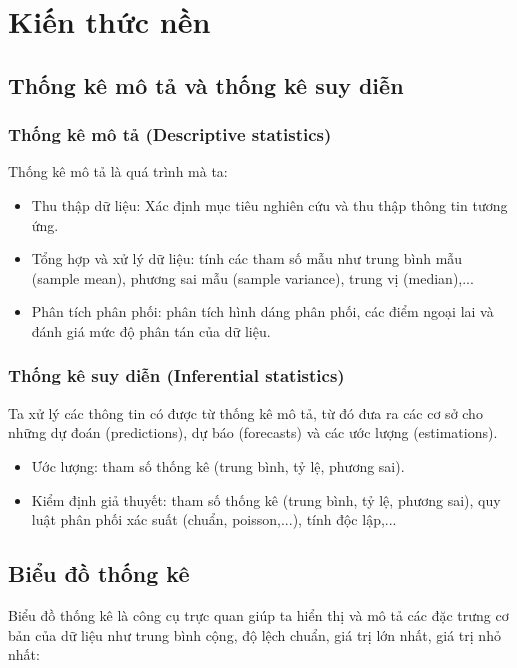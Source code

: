 \section{Kiến thức nền}
\subsection{Thống kê mô tả và thống kê suy diễn}
\subsubsection{Thống kê mô tả (Descriptive statistics)} 
Thống kê mô tả là quá trình mà ta:
\begin{itemize}
    \item Thu thập dữ liệu: Xác định mục tiêu nghiên cứu và thu thập thông tin tương ứng.
    \item Tổng hợp và xử lý dữ liệu: tính các tham số mẫu như trung bình mẫu (sample mean), phương sai mẫu (sample variance), trung vị (median),...
    \item Phân tích phân phối: phân tích hình dáng phân phối, các điểm ngoại lai và đánh giá mức độ phân tán của dữ liệu.
\end{itemize}
\subsubsection{Thống kê suy diễn (Inferential statistics)}
Ta xử lý các thông tin có được từ thống kê mô tả, từ đó đưa ra các cơ sở cho những dự đoán (predictions), dự báo (forecasts) và các ước lượng (estimations).
\begin{itemize}
    \item Ước lượng: tham số thống kê (trung bình, tỷ lệ, phương sai).
    \item Kiểm định giả thuyết: tham số thống kê (trung bình, tỷ lệ, phương sai), quy luật phân phối xác suất (chuẩn, poisson,...), tính độc lập,...
\end{itemize}
\subsection{Biểu đồ thống kê}

Biểu đồ thống kê là công cụ trực quan giúp ta hiển thị và mô tả các đặc trưng cơ bản của dữ liệu như trung bình cộng, độ lệch chuẩn, giá trị lớn nhất, giá trị nhỏ nhất:


